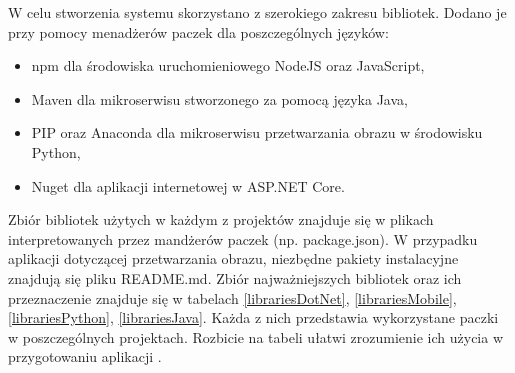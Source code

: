 W celu stworzenia systemu skorzystano z szerokiego zakresu bibliotek. Dodano je przy pomocy menadżerów paczek dla poszczególnych języków:
\begin{itemize}[noitemsep]
	\item npm dla środowiska uruchomieniowego NodeJS oraz JavaScript,
	\item Maven dla mikroserwisu stworzonego za pomocą języka Java,
	\item PIP oraz Anaconda dla mikroserwisu przetwarzania obrazu w środowisku Python,
	\item Nuget dla aplikacji internetowej w ASP.NET Core.
\end{itemize}

Zbiór bibliotek użytych w każdym z projektów znajduje się w plikach interpretowanych przez mandżerów paczek (np. package.json). W przypadku aplikacji dotyczącej przetwarzania obrazu, niezbędne pakiety instalacyjne znajdują się pliku README.md. Zbiór najważniejszych bibliotek oraz ich przeznaczenie znajduje się w tabelach \ref{librariesDotNet}, \ref{librariesMobile}, \ref{librariesPython}, \ref{librariesJava}. Każda z nich przedstawia wykorzystane paczki w poszczególnych projektach. Rozbicie na tabeli ułatwi zrozumienie ich użycia w przygotowaniu aplikacji .

